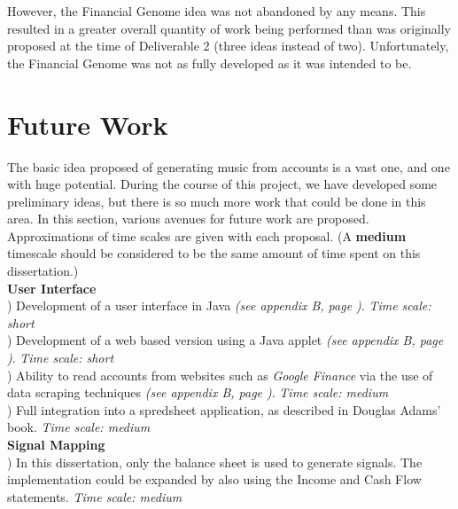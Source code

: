 However, the Financial Genome idea was not abandoned by any means. This resulted in a greater overall quantity of work being performed than was originally proposed at the time of Deliverable 2 (three ideas instead of two). Unfortunately, the Financial Genome was not as fully developed as it was intended to be.

\section{Future Work}

The basic idea proposed of generating music from accounts is a vast one, and one with huge potential. During the course of this project, we have developed some preliminary ideas, but there is so much more work that could be done in this area. In this section, various avenues for future work are proposed.
Approximations of time scales are given with each proposal. (A \textbf{medium} timescale should be considered to be the same amount of time spent on this dissertation.) \\

\noindent \textbf{User Interface} \\

) Development of a user interface in Java \textit{(see appendix B, page \pageref{appendix:interfaces1})}. \textit{Time scale: short}\\

) Development of a web based version using a Java applet \textit{(see appendix B, page \pageref{appendix:interfaces1})}. \textit{Time scale: short} \\

) Ability to read accounts from websites such as \textit{Google Finance} via the use of data scraping techniques \textit{(see appendix B, page \pageref{appendix:interfaces2})}. \textit{Time scale: medium} \\

) Full integration into a spredsheet application, as described in Douglas Adams' book. \textit{Time scale: medium} \\

\noindent \textbf{Signal Mapping} \\

) In this dissertation, only the balance sheet is used to generate signals. The implementation could be expanded by also using the Income and Cash Flow statements. \textit{Time scale: medium} \\

